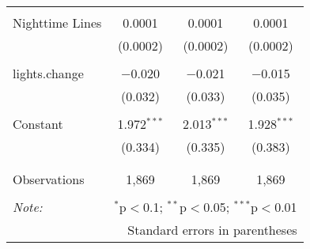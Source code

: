 \begin{table}[!htbp]
\begin{tabular}{@{\extracolsep{5pt}}lccc}
  & & & \\ 
 Nighttime Lines & 0.0001 & 0.0001 & 0.0001 \\ 
  & (0.0002) & (0.0002) & (0.0002) \\ 
  & & & \\ 
 lights.change & $-$0.020 & $-$0.021 & $-$0.015 \\ 
  & (0.032) & (0.033) & (0.035) \\ 
  & & & \\ 
 Constant & 1.972$^{***}$ & 2.013$^{***}$ & 1.928$^{***}$ \\ 
  & (0.334) & (0.335) & (0.383) \\ 
  & & & \\ 
\hline \\[-1.8ex] 
Observations & 1,869 & 1,869 & 1,869 \\ 
\hline 
\hline \\[-1.8ex] 
\textit{Note:}  & \multicolumn{3}{r}{$^{*}$p$<$0.1; $^{**}$p$<$0.05; $^{***}$p$<$0.01} \\ 
 & \multicolumn{3}{r}{Standard errors in parentheses} \\ 
\end{tabular} 
\end{table} 
